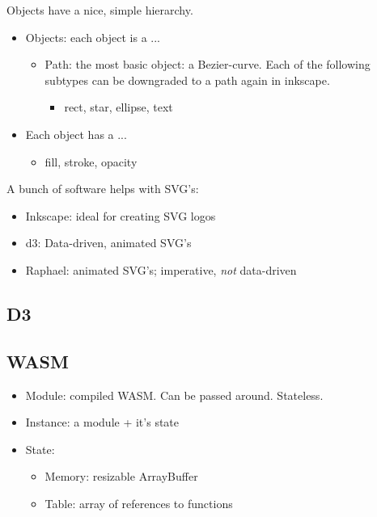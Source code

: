 Objects have a nice, simple hierarchy.
\begin{itemize}
    \item Objects: each object is a ...
        \begin{itemize}
            \item Path: the most basic object: a Bezier-curve. Each of the following subtypes can be downgraded to a path again in inkscape.
                \begin{itemize}
                    \item rect, star, ellipse, text
                \end{itemize}
        \end{itemize}
    \item Each object has a ... 
        \begin{itemize}
            \item fill, stroke, opacity
        \end{itemize}
\end{itemize}

A bunch of software helps with SVG's:
\begin{itemize}
    \item Inkscape: ideal for creating SVG logos
    \item d3: Data-driven, animated SVG's
    \item Raphael: animated SVG's; imperative, \emph{not} data-driven
\end{itemize}


\subsection{D3}

\subsection{WASM}

\begin{itemize}
    \item Module: compiled WASM. Can be passed around. Stateless.
    \item Instance: a module + it's state
    \item State: 
        \begin{itemize}
            \item Memory: resizable ArrayBuffer
            \item Table: array of references to functions
        \end{itemize}
\end{itemize}

